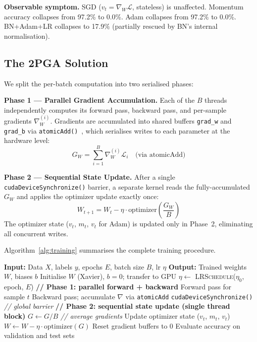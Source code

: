 \documentclass[conference]{IEEEtran}
\begin{document}
\textbf{Observable symptom.} SGD ($v_t = \nabla_W \mathcal{L}$, stateless) is unaffected. Momentum accuracy collapses from 97.2\% to 0.0\%. Adam collapses from 97.2\% to 0.0\%. BN+Adam+LR collapses to 17.9\% (partially rescued by BN's internal normalisation).

\subsection{The 2PGA Solution}

We split the per-batch computation into two serialised phases:

\textbf{Phase 1 — Parallel Gradient Accumulation.} Each of the $B$ threads independently computes its forward pass, backward pass, and per-sample gradients $\nabla_W^{(i)}$. Gradients are accumulated into shared buffers \texttt{grad\_w} and \texttt{grad\_b} via \texttt{atomicAdd()}~\cite{b18}, which serialises writes to each parameter at the hardware level:
\begin{equation}
G_W = \sum_{i=1}^{B} \nabla_W^{(i)} \mathcal{L}_i \quad \text{(via atomicAdd)}
\end{equation}

\textbf{Phase 2 — Sequential State Update.} After a single \texttt{cudaDeviceSynchronize()} barrier, a separate kernel reads the fully-accumulated $G_W$ and applies the optimizer update exactly once:
\begin{equation}
W_{t+1} = W_t - \eta \cdot \text{optimizer}\!\left(\frac{G_W}{B}\right)
\end{equation}
The optimizer state ($v_t$, $m_t$, $v_t$ for Adam) is updated only in Phase~2, eliminating all concurrent writes.

Algorithm~\ref{alg:training} summarises the complete training procedure.

\begin{algorithm}
\caption{CUDAnet Training with 2PGA}
\label{alg:training}
\begin{algorithmic}[1]
\STATE \textbf{Input:} Data $X$, labels $y$, epochs $E$, batch size $B$, lr $\eta$
\STATE \textbf{Output:} Trained weights $W$, biases $b$
\STATE Initialise $W$ (Xavier), $b=0$; transfer to GPU
    \STATE $\eta \leftarrow$ \textsc{LRSchedule}($\eta_0$, epoch, $E$)
        \STATE \textbf{// Phase 1: parallel forward + backward}
            \STATE Forward pass for sample $t$
            \STATE Backward pass; accumulate $\nabla$ via \texttt{atomicAdd}
        \ENDFOR
        \STATE \texttt{cudaDeviceSynchronize()} \hfill\textit{// global barrier}
        \STATE \textbf{// Phase 2: sequential state update (single thread block)}
        \STATE $G \leftarrow G / B$ \hfill\textit{// average gradients}
        \STATE Update optimizer state ($v_t$, $m_t$, $v_t$)
        \STATE $W \leftarrow W - \eta \cdot \text{optimizer}(G)$
        \STATE Reset gradient buffers to 0
    \ENDFOR
    \STATE Evaluate accuracy on validation and test sets
\ENDFOR
\end{algorithmic}
\end{algorithm}
\end{document}
